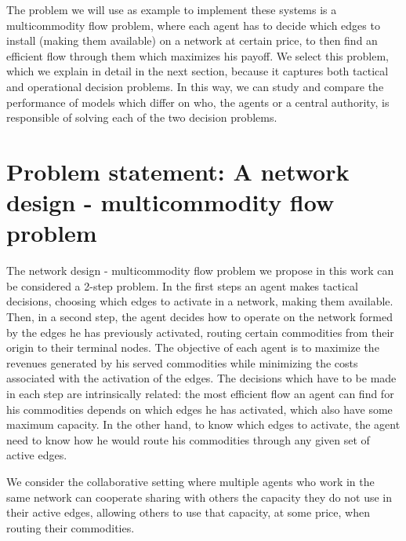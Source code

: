 \documentclass{article}
\begin{document}
The problem we will use as example to implement these systems is a multicommodity flow problem, where each agent has to decide which edges to install (making them available) on a network at certain price, to then find an efficient flow through them which maximizes his payoff. We select this problem, which we explain in detail in the next section, because it captures both tactical and operational decision problems. In this way, we can study and compare the performance of models which differ on who, the agents or a central authority, is responsible of solving each of the two decision problems.

\section{Problem statement: A network design - multicommodity flow problem}\label{seq:probdefinition} 

The network design - multicommodity flow problem we propose in this work can be considered a 2-step problem. In the first steps an agent makes tactical decisions, choosing which edges to activate in a network, making them available. Then, in a second step, the agent decides how to operate on the network formed by the edges he has previously activated, routing certain commodities from their origin to their terminal nodes.
The objective of each agent is to maximize the revenues generated by his served commodities while minimizing the costs associated with the activation of the edges.
The decisions which have to be made in each step are intrinsically related: the most efficient flow an agent can find for his commodities depends on which edges he has activated, which also have some maximum capacity. In the other hand, to know which edges to activate, the agent need to know how he would route his commodities through any given set of active edges. 

We consider the collaborative setting where multiple agents who work in the same network can cooperate sharing with others the capacity they do not use in their active edges, allowing others to use that capacity, at some price, when routing their commodities.
\end{document}
